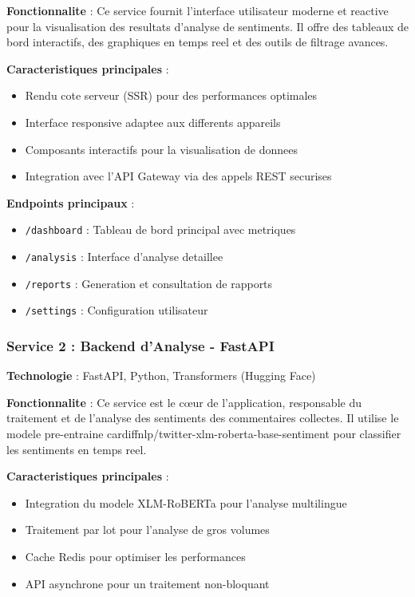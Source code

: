 \textbf{Fonctionnalite} : Ce service fournit l'interface utilisateur moderne et reactive pour la visualisation des resultats d'analyse de sentiments. Il offre des tableaux de bord interactifs, des graphiques en temps reel et des outils de filtrage avances.

\textbf{Caracteristiques principales} :
\begin{itemize}
    \item Rendu cote serveur (SSR) pour des performances optimales
    \item Interface responsive adaptee aux differents appareils
    \item Composants interactifs pour la visualisation de donnees
    \item Integration avec l'API Gateway via des appels REST securises
\end{itemize}

\textbf{Endpoints principaux} :
\begin{itemize}
    \item \texttt{/dashboard} : Tableau de bord principal avec metriques
    \item \texttt{/analysis} : Interface d'analyse detaillee
    \item \texttt{/reports} : Generation et consultation de rapports
    \item \texttt{/settings} : Configuration utilisateur
\end{itemize}

\subsubsection{Service 2 : Backend d'Analyse - FastAPI}

\textbf{Technologie} : FastAPI, Python, Transformers (Hugging Face)

\textbf{Fonctionnalite} : Ce service est le cœur de l'application, responsable du traitement et de l'analyse des sentiments des commentaires collectes. Il utilise le modele pre-entraine cardiffnlp/twitter-xlm-roberta-base-sentiment pour classifier les sentiments en temps reel.

\textbf{Caracteristiques principales} :
\begin{itemize}
    \item Integration du modele XLM-RoBERTa pour l'analyse multilingue
    \item Traitement par lot pour l'analyse de gros volumes
    \item Cache Redis pour optimiser les performances
    \item API asynchrone pour un traitement non-bloquant
\end{itemize}


